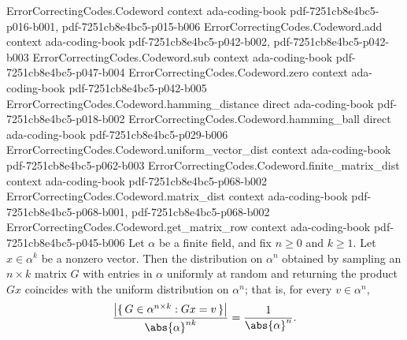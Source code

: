 \begin{theorem}
\label{ErrorCorrectingCodes.Codeword.uniformity_lemma}
\leanok
{}
\proofstep
  {ErrorCorrectingCodes.Codeword}
  {context}
  {ada-coding-book}
  {pdf-7251cb8e4bc5-p016-b001,
    pdf-7251cb8e4bc5-p015-b006}
\proofstep
  {ErrorCorrectingCodes.Codeword.add}
  {context}
  {ada-coding-book}
  {pdf-7251cb8e4bc5-p042-b002,
    pdf-7251cb8e4bc5-p042-b003}
\proofstep
  {ErrorCorrectingCodes.Codeword.sub}
  {context}
  {ada-coding-book}
  {pdf-7251cb8e4bc5-p047-b004}
\proofstep
  {ErrorCorrectingCodes.Codeword.zero}
  {context}
  {ada-coding-book}
  {pdf-7251cb8e4bc5-p042-b005}
\proofstep
  {ErrorCorrectingCodes.Codeword.hamming_distance}
  {direct}
  {ada-coding-book}
  {pdf-7251cb8e4bc5-p018-b002}
\proofstep
  {ErrorCorrectingCodes.Codeword.hamming_ball}
  {direct}
  {ada-coding-book}
  {pdf-7251cb8e4bc5-p029-b006}
\proofstep
  {ErrorCorrectingCodes.Codeword.uniform_vector_dist}
  {context}
  {ada-coding-book}
  {pdf-7251cb8e4bc5-p062-b003}
\proofstep
  {ErrorCorrectingCodes.Codeword.finite_matrix_dist}
  {context}
  {ada-coding-book}
  {pdf-7251cb8e4bc5-p068-b002}
\proofstep
  {ErrorCorrectingCodes.Codeword.matrix_dist}
  {context}
  {ada-coding-book}
  {pdf-7251cb8e4bc5-p068-b001,
    pdf-7251cb8e4bc5-p068-b002}
\proofstep
  {ErrorCorrectingCodes.Codeword.get_matrix_row}
  {context}
  {ada-coding-book}
  {pdf-7251cb8e4bc5-p045-b006}
Let $\alpha$ be a finite field, and fix $n \ge 0$ and $k \ge 1$. Let $x \in \alpha^k$ be
a nonzero vector. Then the distribution on $\alpha^n$ obtained by sampling an $n \times
k$ matrix $G$ with entries in $\alpha$ uniformly at random and returning the product
$Gx$ coincides with the uniform distribution on $\alpha^n$; that is, for every $v \in
\alpha^n$,
\[
\frac{\bigl|\{\,G \in \alpha^{n \times k} : Gx = v\,\}\bigr|}{\abs{\alpha}^{nk}} =
\frac{1}{\abs{\alpha}^{n}}.
\]
\end{theorem}
